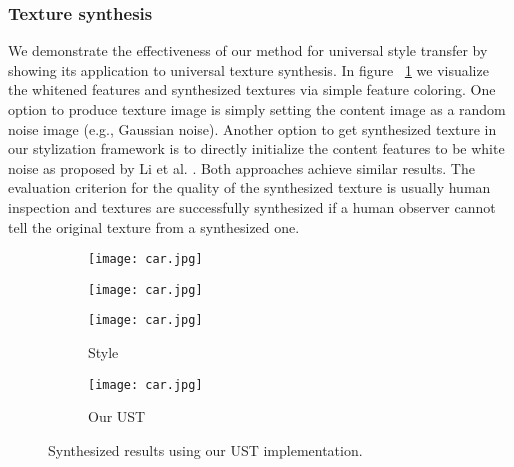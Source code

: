 \subsubsection{Texture synthesis}
We demonstrate the effectiveness of our method for universal style transfer by showing its application to universal texture synthesis. In figure ~\ref{fig:texture} we visualize the whitened features and
synthesized textures via simple feature coloring.
One option to produce texture image is simply setting the content image as a random noise image (e.g., Gaussian noise). Another option to get synthesized texture in our stylization framework is to directly initialize the content features to be white noise as proposed by Li et al. \cite{bib11}. Both approaches achieve similar results.
The evaluation criterion for the quality of the synthesized texture is usually human inspection and textures are successfully synthesized if a human observer cannot tell the original texture from a synthesized one.
\begin{figure}[H]
	\centering
	\begin{subfigure}[b]{0.4\linewidth}
		\texttt{[image: car.jpg]} %
	\end{subfigure}
	\begin{subfigure}[b]{0.4\linewidth}
		\texttt{[image: car.jpg]} %
	\end{subfigure}
	\centering
	\begin{subfigure}[b]{0.4\linewidth}
		\texttt{[image: car.jpg]} %
		\caption{Style}
	\end{subfigure}
	\begin{subfigure}[b]{0.4\linewidth}
		\texttt{[image: car.jpg]} %
		\caption{Our UST}
	\end{subfigure}
	\caption{Synthesized results using our UST implementation.}
	\label{fig:texture}
\end{figure}